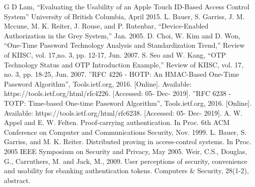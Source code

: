 \documentclass[conference]{IEEEtran}
\begin{document}




\begin{thebibliography}{00}
 G D Lam, “Evaluating the Usability of an Apple Touch ID-Based Access Control System” University of British Columbia, April 2015.
 L. Bauer, S. Garriss, J. M. Mccune, M. K. Reiter, J. Rouse, and P. Rutenbar, “Device-Enabled Authorization in the Grey System,” Jan. 2005.
 D. Choi, W. Kim and D. Won, “One-Time Password Technology Analysis and Standardization Trend,” Review of KIISC, vol. 17,no. 3, pp. 12-17, Jun. 2007.
 S. Seo and W. Kang, “OTP Technology Status and OTP Introduction Example,” Review of KIISC, vol. 17, no. 3, pp. 18-25, Jun. 2007.
 ”RFC 4226 - HOTP: An HMAC-Based One-Time Password Algorithm”, Tools.ietf.org, 2016. [Online]. Available: https://tools.ietf.org/html/rfc4226. [Accessed: 05- Dec- 2019].
 ”RFC 6238 - TOTP: Time-based One-time Password Algorithm”, Tools.ietf.org, 2016. [Online]. Available: https://tools.ietf.org/html/rfc6238. [Accessed: 05- Dec- 2019].
 A. W. Appel and E. W. Felten. Proof-carrying authentication. In Proc. 6th ACM Conference on Computer and Communications Security, Nov. 1999.
 L. Bauer, S. Garriss, and M. K. Reiter. Distributed proving in access-control systems. In Proc. 2005 IEEE Symposium on Security and Privacy, May 2005.
 Weir, C.S., Douglas, G., Carruthers, M. and Jack, M., 2009. User perceptions of security, convenience and usability for ebanking authentication tokens. Computers \& Security, 28(1-2), abstract.
\end{thebibliography}
\end{document}
